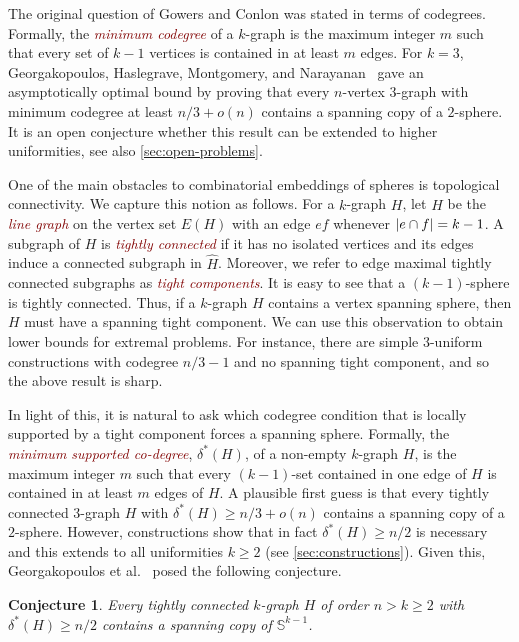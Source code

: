 \documentclass[12pt,reqno]{amsart}
\theoremstyle{plain}
\newtheorem{conjecture}[theorem]{Conjecture}
\theoremstyle{definition}
\numberwithin{equation}{section}
\DeclarePairedDelimiter{\abs}{\lvert}{\rvert}
\renewcommand{\ge}{\geqslant}
\renewcommand{\geq}{\geqslant}
\newcommand{\defn}[1]{\textcolor{Maroon}{\emph{#1}}}
\newcommand{\comin}{\delta^{\ast}}
\newcommand{\bS}{\mathbb{S}}
\begin{document}
	The original question of Gowers and Conlon was stated in terms of codegrees.
	Formally, the \defn{minimum codegree} of a $k$-graph is the maximum integer $m$ such that every set of $k-1$ vertices is contained in at least $m$ edges.
	For $k=3$, Georgakopoulos, Haslegrave, Montgomery, and Narayanan~\cite{georgakopoulos2022spanning} gave an asymptotically optimal bound by proving that every $n$-vertex $3$-graph with minimum codegree at least $n/3 + o(n)$ contains a spanning copy of a $2$-sphere.
	It is an open conjecture whether this result can be extended to higher uniformities, see also \cref{sec:open-problems}.
	
	One of the main obstacles to combinatorial embeddings of spheres is topological connectivity.
	We capture this notion as follows.
	For a $k$-graph $H$, let $\hat H$ be the \defn{line graph} on the vertex set $E(H)$ with an edge $ef$ whenever $\abs{e \cap f} = k - 1$.
	A subgraph of $H$ is \defn{tightly connected} if it has no isolated vertices and its edges induce a connected subgraph in $\hat{H}$.
	Moreover, we refer to edge maximal tightly connected subgraphs as \defn{tight components}.
	It is easy to see that a $(k - 1)$-sphere is tightly connected.
	Thus, if a $k$-graph $H$ contains a vertex spanning sphere, then $H$ must have a spanning tight component.
	We can use this observation to obtain lower bounds for extremal problems.
	For instance, there are simple $3$-uniform constructions with codegree $n/3 - 1$ and no spanning tight component, and so the above result is sharp.
	
	In light of this, it is natural to ask which codegree condition that is locally supported by a tight component forces a spanning sphere.
	Formally, the \defn{minimum supported co-degree}, $\comin(H)$, of a non-empty $k$-graph $H$, is the maximum integer $m$ such that every $(k - 1)$-set contained in one edge of $H$ is contained in at least $m$ edges of $H$.
	A plausible first guess is that every tightly connected $3$-graph $H$ with $\delta^\ast(H)\geq n/3+o(n)$ contains a spanning copy of a $2$-sphere.
	However, constructions show that in fact $\delta^\ast(H)\geq n/2$ is necessary and this extends to all uniformities $k\geq 2$
	(see \cref{sec:constructions}).
	Given this, Georgakopoulos et al.~\cite{georgakopoulos2022spanning} posed the following conjecture.
	
	\begin{conjecture}\label{conj:mainconj}
		Every tightly connected $k$-graph $H$ of order $n> k \geq 2$ with $\comin(H) \ge n/2$ contains a spanning copy of $\bS^{k - 1}$.
	\end{conjecture}
	
\end{document}
